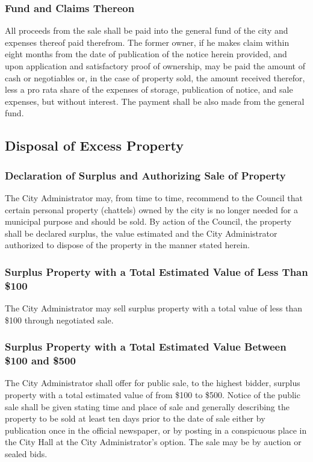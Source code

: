 \subsubsection{Fund and Claims Thereon}
All proceeds from the sale shall be paid into the general fund of the city and expenses thereof paid therefrom. The former owner, if he makes claim within eight months from the date of publication of the notice herein provided, and upon application and satisfactory proof of ownership, may be paid the amount of cash or negotiables or, in the case of property sold, the amount received therefor, less a pro rata share of the expenses of storage, publication of notice, and sale expenses, but without interest.  The payment shall be also made from the general fund.
\subsection{Disposal of Excess Property}
\subsubsection{Declaration of Surplus and Authorizing Sale of Property}
The City Administrator may, from time to time, recommend to the Council that certain personal property (chattels) owned by the city is no longer needed for a municipal purpose and should be sold. By action of the Council, the property shall be declared surplus, the value estimated and the City Administrator authorized to dispose of the property in the manner stated herein.
\subsubsection{Surplus Property with a Total Estimated Value of Less Than \$100}
The City Administrator may sell surplus property with a total value of less than \$100 through negotiated sale.
\subsubsection{Surplus Property with a Total Estimated Value Between \$100 and \$500}
The City Administrator shall offer for public sale, to the highest bidder, surplus property with a total estimated value of from \$100 to \$500. Notice of the public sale shall be given stating time and place of sale and generally describing the property to be sold at least ten days prior to the date of sale either by publication once in the official newspaper, or by posting in a conspicuous place in the City Hall at the City Administrator’s option. The sale may be by auction or sealed bids.
